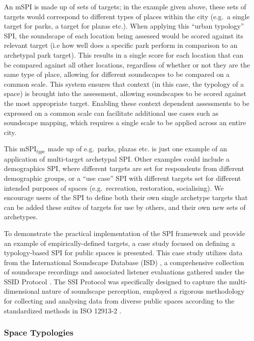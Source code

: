 \documentclass[
  authoryear,
  preprint,
  3p]{elsarticle}
\begin{document}
An mSPI is made up of sets of targets; in the example given above, these
sets of targets would correspond to different types of places within the
city (e.g.~a single target for parks, a target for plazas etc.). When
applying this ``urban typology'' SPI, the soundscape of each location
being assessed would be scored against its relevant target (i.e how well
does a specific park perform in comparison to an archetypal park
target). This results in a single score for each location that can be
compared against all other locations, regardless of whether or not they
are the same type of place, allowing for different soundscapes to be
compared on a common scale. This system ensures that context (in this
case, the typology of a space) is brought into the assessment, allowing
soundscapes to be scored against the most appropriate target. Enabling
these context dependent assessments to be expressed on a common scale
can facilitate additional use cases such as soundscape mapping, which
requires a single scale to be applied across an entire city.

This \(\text{mSPI}_{type}\) made up of e.g.~parks, plazas etc. is just
one example of an application of multi-target archetypal SPI. Other
examples could include a demographics SPI, where different targets are
set for respondents from different demographic groups, or a ``use case''
SPI with different targets set for different intended purposes of spaces
(e.g.~recreation, restoration, socialising). We encourage users of the
SPI to define both their own single archetype targets that can be added
these suites of targets for use by others, and their own new sets of
archetypes.

To demonstrate the practical implementation of the SPI framework and
provide an example of empirically-defined targets, a case study focused
on defining a typology-based SPI for public spaces is presented. This
case study utilizes data from the International Soundscape Database
(ISD) \citep{Mitchell2021International}, a comprehensive collection of
soundscape recordings and associated listener evaluations gathered under
the SSID Protocol \citep{Mitchell2020Soundscape}. The SSI Protocol was
specifically designed to capture the multi-dimensional nature of
soundscape perception, employed a rigorous methodology for collecting
and analysing data from diverse public spaces according to the
standardized methods in ISO 12913-2 \citep{ISO12913Part2}.

\subsubsection{Space Typologies}\label{space-typologies}
\end{document}
